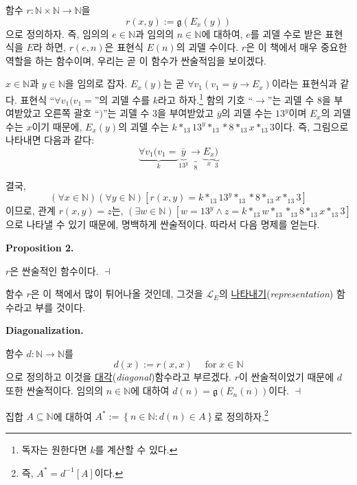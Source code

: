 \documentclass[12pt]{paper}
\newcommand{\gnum}
{ \mathfrak{g} }
\newenvironment{context}[1][]
{ \noindent \textbf{{#1}.}
}
{ \hfill $ \dashv $ }
\begin{document}
함수 $r : \mathbb{N} \times \mathbb{N} \to \mathbb{N}$을 $$ r \left( x , y \right) := \gnum \left( E_x \left( y \right) \right) $$으로 정의하자.
즉, 임의의 $e \in \mathbb{N}$과 임의의 $n \in \mathbb{N}$에 대하여,
$e$를 괴델 수로 받은 표현식을 $E$라 하면, $r \left( e , n \right)$은 표현식 $E \left( n \right)$의 괴델 수이다.
$r$은 이 책에서 매우 중요한 역할을 하는 함수이며, 우리는 곧 이 함수가 싼술적임을 보이겠다.

$x \in \mathbb{N}$과 $y \in \mathbb{N}$을 임의로 잡자.
$E_x \left( y \right)$는 곧 $\forall v_1 \left( v_1 = \overline{y} \rightarrow E_x \right)$이라는 표현식과 같다.
표현식 ``$ \forall v_1 ( v_1 = $''의 괴델 수를 $k$라고 하자.\footnote
{
독자는 원한다면 $k$를 계산할 수 있다.
}
함의 기호 ``$\rightarrow$''는 괴델 수 $8$을 부여받았고
오른쪽 괄호 ``$)$''는 괴델 수 $3$을 부여받았고
$\overline{y}$의 괴델 수는 $13^{y}$이며 $E_x$의 괴델 수는 $x$이기 때문에,
$E_x \left( y \right)$의 괴델 수는 $k *_{13} 13^{y} *_{13} * 8 *_{13} x *_{13} 3$이다.
즉, 그림으로 나타내면 다음과 같다: $$ \underbrace{\forall v_1 ( v_1 =}_{k} \underbrace{\overline{y}}_{13^{y}} \underbrace{\rightarrow}_{8} \underbrace{E_x}_{x} \underbrace{)}_{3}$$

결국, $$\left( \forall x \in \mathbb{N} \right) \left( \forall y \in \mathbb{N} \right) \left[ r \left( x , y \right) = k *_{13} 13^{y} *_{13} * 8 *_{13} x *_{13} 3 \right]$$이므로,
관계 $r \left( x , y \right) = z$는, $\left( \exists w \in \mathbb{N} \right) \left[ w = 13^{y} \land z = k *_{13} w *_{13} *_{13} 8 *_{13} x *_{13} 3 \right]$으로 나타낼 수 있기 때문에, 명백하게 싼술적이다.
따라서 다음 명제를 얻는다.

\begin{context}[Proposition 2]
$r$은 싼술적인 함수이다.
\end{context}

함수 $r$은 이 책에서 많이 튀어나올 것인데, 그것을 $\mathcal{L}_{E}$의 \underline{나타내기}(\textit{representation}) 함수라고 부를 것이다.

\begin{context}[Diagonalization]
함수 $d : \mathbb{N} \to \mathbb{N}$를 $$d \left( x \right) := r \left( x , x \right) \quad \mathop{\mathrm{for}} x \in \mathbb{N} $$으로 정의하고
이것을 \underline{대각}(\textit{diagonal})함수라고 부르겠다.
$r$이 싼술적이었기 때문에 $d$ 또한 싼술적이다.
임의의 $n \in \mathbb{N}$에 대하여 $d \left( n \right) = \gnum \left( E_{n} \left( n \right) \right)$이다.
\end{context}

집합 $A \subseteq \mathbb{N}$에 대하여 $A^{*} := \left\{ n \in \mathbb{N} : d \left( n \right) \in A \right\}$로 정의하자.\footnote
{
즉, $A^{*} = d^{-1} \left[ A \right]$이다.
}
\end{document}
